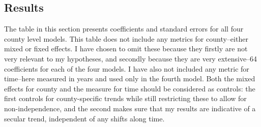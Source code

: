 \documentclass[12pt,twoside]{reedthesis}
\begin{document}
  \subsection{Results}\label{results}
  
  The table in this section presents coefficients and standard errors for
  all four county level models. This table does not include any metrics
  for county--either mixed or fixed effects. I have chosen to omit these
  because they firstly are not very relevant to my hypotheses, and
  secondly because they are very extensive--64 coefficients for each of
  the four models. I have also not included any metric for time--here
  measured in years and used only in the fourth model. Both the mixed
  effects for county and the measure for time should be considered as
  controls: the first controls for county-specific trends while still
  restricting these to allow for non-independence, and the second makes
  sure that my results are indicative of a secular trend, independent of
  any shifts along time.
  
\end{document}
